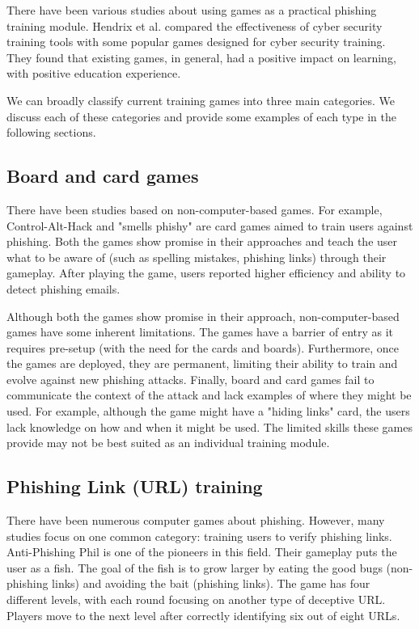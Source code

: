 There have been various studies about using games as a practical phishing training module. Hendrix et al. \cite{hendrix_al_sherbaz_bloom_2016} compared the effectiveness of cyber security training tools with some popular games designed for cyber security training. They found that existing games, in general, had a positive impact on learning, with positive education experience.

We can broadly classify current training games into three main categories. We discuss each of these categories and provide some examples of each type in the following sections.

\subsection{Board and card games}
There have been studies based on non-computer-based games. For example, Control-Alt-Hack \cite{control_alt_hack} and "smells phishy" \cite{smels_phishy} are card games aimed to train users against phishing. Both the games show promise in their approaches and teach the user what to be aware of (such as spelling mistakes, phishing links) through their gameplay. After playing the game, users reported higher efficiency and ability to detect phishing emails.

Although both the games show promise in their approach, non-computer-based games have some inherent limitations. The games have a barrier of entry as it requires pre-setup (with the need for the cards and boards). Furthermore, once the games are deployed, they are permanent, limiting their ability to train and evolve against new phishing attacks. Finally, board and card games fail to communicate the context of the attack and lack examples of where they might be used. For example, although the game might have a "hiding links" card, the users lack knowledge on how and when it might be used. The limited skills these games provide may not be best suited as an individual training module.

\subsection{Phishing Link (URL) training}
There have been numerous computer games about phishing. However, many studies focus on one common category: training users to verify phishing links. Anti-Phishing Phil \cite{anti_phishing_phil} is one of the pioneers in this field. Their gameplay puts the user as a fish. The goal of the fish is to grow larger by eating the good bugs (non-phishing links) and avoiding the bait (phishing links). The game has four different levels, with each round focusing on another type of deceptive URL. Players move to the next level after correctly identifying six out of eight URLs.

